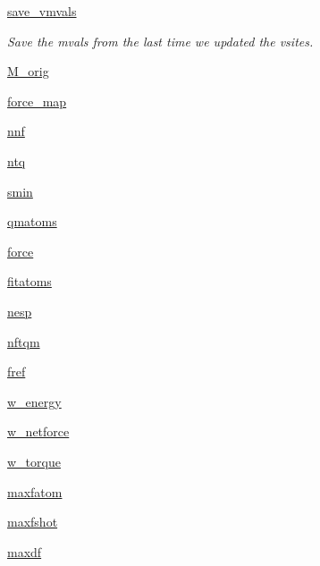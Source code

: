 \begin{DoxyCompactItemize}
\hyperlink{classsrc_1_1abinitio_1_1AbInitio_a91982f5bbc37e6dffc3484912d605672}{save\+\_\+vmvals}
\begin{DoxyCompactList}\small\item\em Save the mvals from the last time we updated the vsites. \end{DoxyCompactList}\item 
\hyperlink{classsrc_1_1abinitio_1_1AbInitio_acb45f30e4dc519406cc9a533b562778f}{M\+\_\+orig}
\item 
\hyperlink{classsrc_1_1abinitio_1_1AbInitio_ae01e6dceba23ad6a532d2fcc0cbee71c}{force\+\_\+map}
\item 
\hyperlink{classsrc_1_1abinitio_1_1AbInitio_a2f016bb1122e78d773f0e5365ef72376}{nnf}
\item 
\hyperlink{classsrc_1_1abinitio_1_1AbInitio_aa8d4dfb98704f06de57a270ba7074d17}{ntq}
\item 
\hyperlink{classsrc_1_1abinitio_1_1AbInitio_aabd18cb0c7bd1a27ae43afeec60a50ed}{smin}
\item 
\hyperlink{classsrc_1_1abinitio_1_1AbInitio_ac6e917779f9240999f9deac94b9fc52b}{qmatoms}
\item 
\hyperlink{classsrc_1_1abinitio_1_1AbInitio_ab026c75ec6db07cfe829718e944a871b}{force}
\item 
\hyperlink{classsrc_1_1abinitio_1_1AbInitio_a5696c164f89abc66027db99e17ebde41}{fitatoms}
\item 
\hyperlink{classsrc_1_1abinitio_1_1AbInitio_ae4adfd62453571f65b443b11e2de28ea}{nesp}
\item 
\hyperlink{classsrc_1_1abinitio_1_1AbInitio_aaccd8efb7ad8718729b040380a9e204f}{nftqm}
\item 
\hyperlink{classsrc_1_1abinitio_1_1AbInitio_aed404f4d80783d9680515bcc40415f43}{fref}
\item 
\hyperlink{classsrc_1_1abinitio_1_1AbInitio_a186f7561777288cd391177ac1bdc2435}{w\+\_\+energy}
\item 
\hyperlink{classsrc_1_1abinitio_1_1AbInitio_ad62612a970e3d20e9ce975134cced90a}{w\+\_\+netforce}
\item 
\hyperlink{classsrc_1_1abinitio_1_1AbInitio_a6a0e3f7148aa806e02f51078ff53076f}{w\+\_\+torque}
\item 
\hyperlink{classsrc_1_1abinitio_1_1AbInitio_a16f13519c011bde03f371e211a8ff383}{maxfatom}
\item 
\hyperlink{classsrc_1_1abinitio_1_1AbInitio_ab88fec9eb79c388520da5f2bc13a20b0}{maxfshot}
\item 
\hyperlink{classsrc_1_1abinitio_1_1AbInitio_aca9f31e080c87f2f525ef4c35ae9c2f9}{maxdf}

\end{DoxyCompactItemize}
